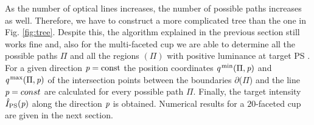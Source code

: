  As the number of optical lines increases, the number of possible paths increases as well.
 Therefore, we have to construct a more complicated tree than the one in Fig. \ref{fig:tree}.
Despite this, the algorithm explained in the previous section still works fine and, also for the multi-faceted cup we are able to determine all the possible paths $\Pi$ and all the regions $(\Pi)$ with positive luminance at target PS .
For a given direction $\textit{p}=\textrm{const}$ the position coordinates $\textit{q}^\textrm{\,min}(\Pi,\textit{p})$ and $\textit{q}^\textrm{\,max}(\Pi,\textit{p})$ of the intersection points between the boundaries $ \partial$($\Pi$) and the line $\textit{p}= const$ are calculated for every possible path $\Pi$. Finally, the target intensity $\hat{I}_{\textrm{PS}}(\textit{p})$ along the direction $\textit{p}$ is obtained.
Numerical results for a $20$-faceted cup are given in the next section.
